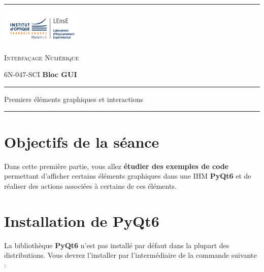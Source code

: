 \documentclass[a4paper,11pt,titlepage]{article} %
\begin{document}
	
\noindent \rule{\linewidth}{1pt}

\newpage
\strut %

\begin{minipage}[c]{.25\linewidth}
	\includegraphics[width=4cm]{images/Logo-LEnsE.png}
\end{minipage} \hfill
\begin{minipage}[c]{.4\linewidth}

\begin{center}
\vspace{0.3cm}
{\Large \textsc{Interfaçage Numérique}}

\medskip

6N-047-SCI \qquad \textbf{\Large Bloc GUI}

\end{center}
\end{minipage}\hfill

\vspace{0.5cm}

\noindent \rule{\linewidth}{1pt}

{\noindent\Large \rule[-7pt]{0pt}{30pt} Premiers éléments graphiques et interactions} 

\noindent \rule{\linewidth}{1pt}


\section{Objectifs de la séance}

Dans cette première partie, vous allez \textbf{étudier des exemples de code} permettant d'afficher certains éléments graphiques dans une IHM \textbf{PyQt6} et de réaliser des actions associées à certains de ces éléments. 


\section{Installation de PyQt6}

La bibliothèque \textbf{PyQt6} n'est pas installé par défaut dans la plupart des distributions. Vous devrez l'installer par l'intermédiaire de la commande suivante :
\end{document}

